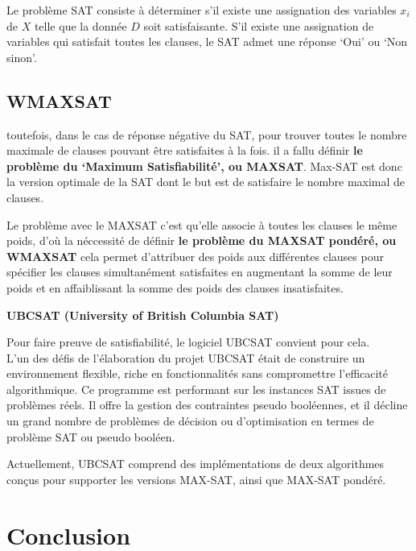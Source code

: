 Le problème SAT consiste à déterminer s’il existe une assignation des variables $x_i$ de $X$ telle que la donnée $D$ soit satisfaisante. S’il existe une assignation de variables qui satisfait toutes les clauses, le SAT admet une réponse ‘Oui’ ou ‘Non sinon’. 
\subsection{WMAXSAT}

toutefois, dans le cas de réponse négative du SAT, pour trouver toutes le nombre maximale de clauses pouvant être satisfaites à la fois. il a fallu définir \textbf{le problème du ‘Maximum Satisfiabilité’, ou MAXSAT}. Max-SAT est donc la version optimale de la SAT dont le but est de satisfaire le nombre maximal de clauses.

Le problème avec le MAXSAT c’est qu’elle associe à toutes les clauses le même poids, d’où la néccessité de définir \textbf{le problème du MAXSAT pondéré, ou WMAXSAT} cela permet d'attribuer des poids aux différentes clauses pour spécifier les clauses simultanément satisfaites en augmentant la somme de leur poids et en affaiblissant la somme des poids des clauses insatisfaites.


\textbf{UBCSAT (University of British Columbia SAT)}

Pour faire preuve de satisfiabilité, le logiciel UBCSAT convient pour cela.\\
L'un des défis de l'élaboration du projet UBCSAT était de construire un environnement flexible, riche en fonctionnalités sans compromettre l'efficacité algorithmique. Ce programme est performant sur les instances SAT issues de problèmes réels. Il offre la gestion des contraintes pseudo booléennes, et il décline un grand nombre de problèmes de décision ou d’optimisation en termes de problème SAT ou pseudo booléen.    

Actuellement, UBCSAT comprend des implémentations de deux algorithmes conçus pour supporter les versions MAX-SAT, ainsi que MAX-SAT pondéré.

\section*{Conclusion}
